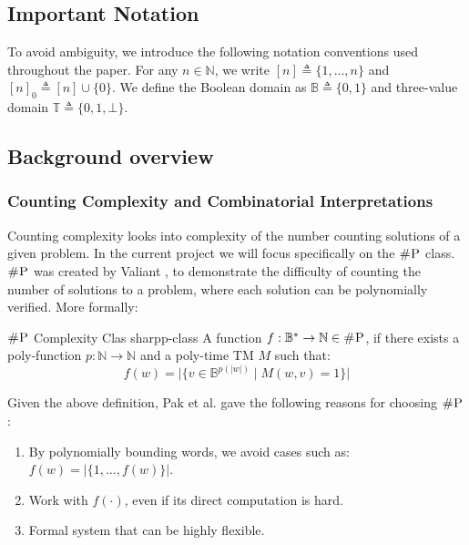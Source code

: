 
\subsection{Important Notation}

To avoid ambiguity, we introduce the following notation conventions used throughout the paper.
For any $n \in \mathbb{N}$, we write $[n] \triangleq \{1, \ldots, n\}$  and $[n]_0 \triangleq [n] \cup \{0\}$. 
We define the Boolean domain as $\mathbb{B} \triangleq \{0, 1\}$ and
three-value domain $\mathbb{T} \triangleq \{0, 1, \bot\}$.


\subsection{Background overview}


\subsubsection{Counting Complexity and Combinatorial Interpretations}

Counting complexity looks into complexity of the number counting solutions
of a given problem. In the current project we will focus specifically on the $\textsc{\#P}$ class.
$\textsc{\#P}$ was created by Valiant \cite{valiant_ComplexityComputingPermanent_1979},
to demonstrate the difficulty of counting the number of solutions to a problem,
where each solution can be polynomially verified. More formally:

\begin{definitionbox}{$\textsc{\#P}$ Complexity Clas \cite{valiant_ComplexityComputingPermanent_1979}}{sharpp-class}
    A function $f: \mathbb{B}^* \to \mathbb{N} \in \textsc{\#P}$, if there exists a
    poly-function $p : \mathbb{N} \to \mathbb{N}$ and a poly-time TM $M$ such that:
    $$
    f(w) = \Big|\Big\{v \in \mathbb{B}^{p(|w|)} \mid M(w, v) =1 \Big\}\Big|
    $$
\end{definitionbox}

Given the above definition, Pak et al. \cite{pak_WhatCombinatorialInterpretation_2022, ikenmeyer_PositivitySymmetricGroup_2024} 
gave the following reasons for choosing $\textsc{\#P}$:

\begin{enumerate}
    \item By polynomially bounding words, we avoid cases such as: $f(w) = |\{1, \hdots, f(w)\}|$.
    \item Work with $f(\cdot)$, even if its direct computation is hard.
    \item Formal system that can be highly flexible.
\end{enumerate}



